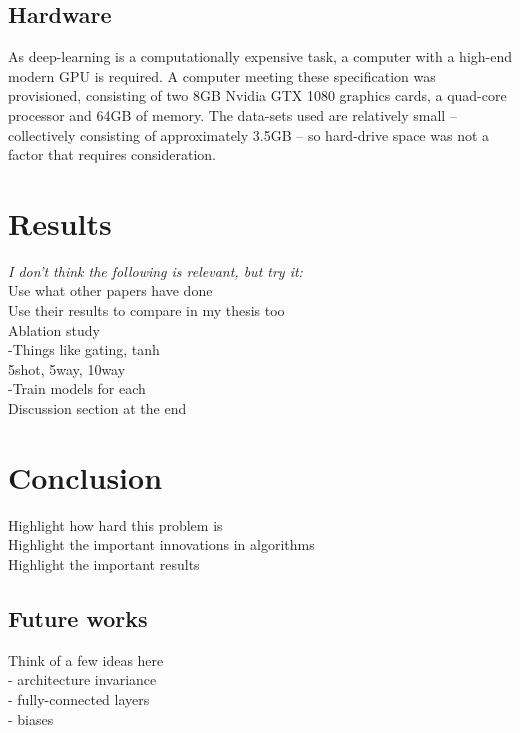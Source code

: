 \documentclass{report}
\begin{document}
\section{Hardware}
As deep-learning is a computationally expensive task, a computer with a high-end modern GPU is required. A computer meeting these specification was provisioned, consisting of two 8GB Nvidia GTX 1080 graphics cards, a quad-core processor and 64GB of memory. The data-sets used are relatively small -- collectively consisting of approximately 3.5GB -- so hard-drive space was not a factor that requires consideration.  \par


\chapter{Results} \label{results-chapter}
\textit{I don't think the following is relevant, but try it:} \\
Use what other papers have done \\
Use their results to compare in my thesis too \\
Ablation study \\
-Things like gating, tanh \\
5shot,  5way, 10way \\
-Train models for each \\
Discussion section at the end \\

\chapter{Conclusion}
Highlight how hard this problem is \\
Highlight the important innovations in algorithms \\
Highlight the important results \\

\section{Future works} \label{future-works}
Think of a few ideas here \\
- architecture invariance \\
  - fully-connected layers \\
  - biases




\printbibliography
\end{document}
